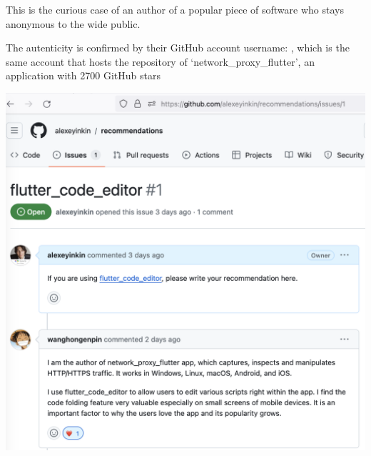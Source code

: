 
This is the curious case of an author of a popular piece of software
who stays anonymous to the wide public.

The autenticity is confirmed by their GitHub account username: ,
which is the same account that hosts the repository of `network\_proxy\_flutter',
an application with 2700 GitHub stars

\begin{center}
    \includegraphics[width=\textwidth]{network-proxy-flutter-recommendation}
\end{center}

\pagebreak
